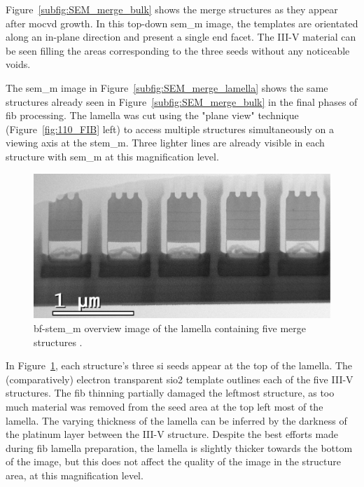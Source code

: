 Figure~\ref{subfig:SEM_merge_bulk} shows the merge structures as they appear after \acs{mocvd} growth. In this top-down \acs{sem_m} image, the templates are orientated along an in-plane  direction and present a single  end facet. The III-V material can be seen filling the areas corresponding to the three seeds without any noticeable voids. 

The \acs{sem_m} image in Figure~\ref{subfig:SEM_merge_lamella} shows the same structures already seen in Figure~\ref{subfig:SEM_merge_bulk} in the final phases of \acs{fib} processing. The lamella was cut using the "plane view" technique (Figure~\ref{fig:110_FIB} left) to access multiple structures simultaneously on a  viewing axis at the \acs{stem_m}. Three lighter lines are already visible in each structure with \acs{sem_m} at this magnification level.

\begin{figure}
    \centering
    \includegraphics[width=\textwidth]{4_Properties/Fig/merge_OV.pdf}
    \caption[\acs{bf}-\acs{stem_m} overview image of the lamella containing five merge structures.]{\acs{bf}-\acs{stem_m} overview image of the lamella containing five merge structures \cite{Brugnolotto2023_2}.}
    \label{fig:merge_ov}
\end{figure}

In Figure~\ref{fig:merge_ov}, each structure's three \acl{si} seeds appear at the top of the lamella. The (comparatively) electron transparent \acs{sio2} template outlines each of the five III-V structures. The \acs{fib} thinning partially damaged the leftmost structure, as too much material was removed from the seed area at the top left most of the lamella. The varying thickness of the lamella can be inferred by the darkness of the platinum layer between the III-V structure. Despite the best efforts made during \acs{fib} lamella preparation, the lamella is slightly thicker towards the bottom of the image, but this does not affect the quality of the image in the structure area, at this magnification level.

